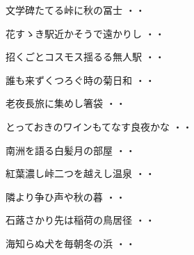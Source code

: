 \vspace{0.6cm}
\begin{shiika}文学碑たてる峠に秋の冨士
\hfill{・・}\end{shiika}
\vspace{0.6cm}
\begin{shiika}花すゝき駅近かそうで遠かりし
\hfill{・・}\end{shiika}
\vspace{0.6cm}
\begin{shiika}招くごとコスモス揺るる無人駅
\hfill{・・}\end{shiika}
\vspace{0.6cm}
\begin{shiika}誰も来ずくつろぐ時の菊日和
\hfill{・・}\end{shiika}
\vspace{0.6cm}
\begin{shiika}老夜長旅に集めし箸袋
\hfill{・・}\end{shiika}
\vspace{0.6cm}
\begin{shiika}とっておきのワインもてなす良夜かな
\hfill{・・}\end{shiika}
\vspace{0.6cm}
\begin{shiika}南洲を語る白髪月の部屋
\hfill{・・}\end{shiika}
\vspace{0.6cm}
\begin{shiika}紅葉濃し峠二つを越えし温泉
\hfill{・・}\end{shiika}
\vspace{0.6cm}
\begin{shiika}隣より争ひ声や秋の暮
\hfill{・・}\end{shiika}
\vspace{0.6cm}
\begin{shiika}石蕗さかり先は稲荷の鳥居径
\hfill{・・}\end{shiika}
\vspace{0.6cm}
\begin{shiika}海知らぬ犬を毎朝冬の浜
\hfill{・・}\end{shiika}
